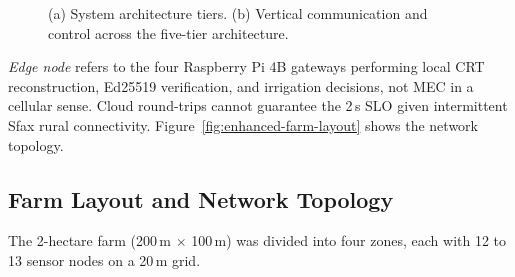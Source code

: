 \documentclass[pdflatex,sn-mathphys-num]{sn-jnl}
\theoremstyle{thmstyleone}
\theoremstyle{thmstyletwo}
\theoremstyle{thmstylethree}
\begin{document}
\begin{figure}[!htbp]
{}%
\caption{(a) System architecture tiers. (b) Vertical communication and control across the five-tier architecture.}
\label{fig:both}
\end{figure}

\emph{Edge node} refers to the four Raspberry Pi 4B gateways performing local CRT reconstruction, Ed25519 verification, and irrigation decisions, not MEC in a cellular sense. Cloud round-trips cannot guarantee the 2\,s SLO given intermittent Sfax rural connectivity. Figure~\ref{fig:enhanced-farm-layout} shows the network topology.

\subsection{Farm Layout and Network Topology}
\label{subsec:farm_layout}

The 2-hectare farm (200\,m $\times$ 100\,m) was divided into four zones, each with 12 to 13 sensor nodes on a 20\,m grid.
\end{document}
